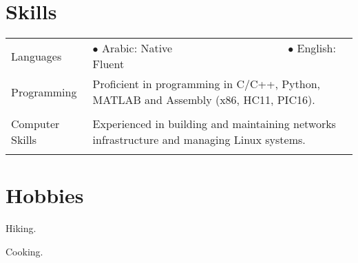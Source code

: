 \documentclass[a4paper, oneside, final]{scrartcl}
\newcommand{\twidthb}{12.65cm}
\newcommand{\twidtha}{3.0cm}
\begin{document}
\section{Skills}

\begin{tabular}{p{\twidtha} p{\twidthb}}
Languages & 

$\bullet$ Arabic: Native \,\,\,\,\,\,\,\,\,\,\,\,\,\,\,\,\,\,\,\,\,\,\,\,\,\,\,\,\,\,\,\,\,\,\,\,\,\,\,\,\,\,\,\,\,\,\,\,\,\,\,\,\,\,\,\,\,\,\,
$\bullet$ English: Fluent

\\
Programming & Proficient in programming in C/C++, Python, MATLAB and Assembly (x86, HC11, PIC16).
\\
\\
Computer Skills & Experienced in building and maintaining networks infrastructure and managing Linux systems.
\\ &
\end{tabular}

\section{Hobbies}
\vspace{-14pt}
\begin{multicols}{2}
        \begin{compactitem}
\item Hiking.
\item Cooking.
            \end{compactitem} 
\end{multicols}


      
\end{document}

